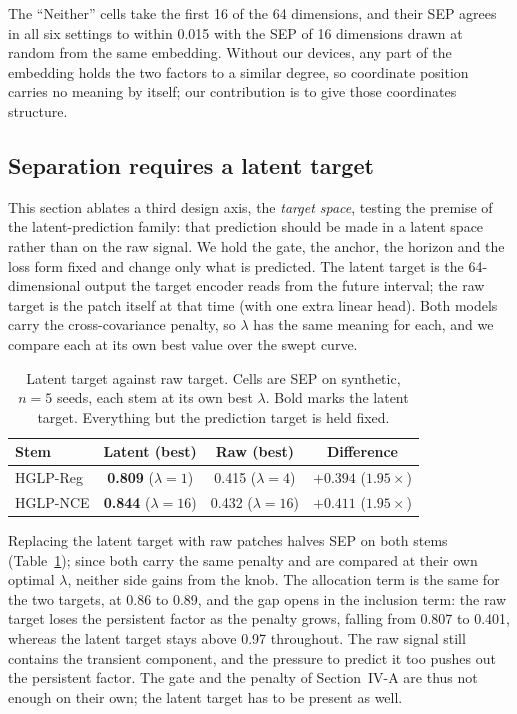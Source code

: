 The ``Neither'' cells take the first 16 of the 64 dimensions, and their SEP agrees in all six settings to within 0.015 with the SEP of 16 dimensions drawn at random from the same embedding. Without our devices, any part of the embedding holds the two factors to a similar degree, so coordinate position carries no meaning by itself; our contribution is to give those coordinates structure.

\subsection{Separation requires a latent target}

This section ablates a third design axis, the \emph{target space}, testing the premise of the latent-prediction family: that prediction should be made in a latent space rather than on the raw signal. We hold the gate, the anchor, the horizon and the loss form fixed and change only what is predicted. The latent target is the 64-dimensional output the target encoder reads from the future interval; the raw target is the patch itself at that time (with one extra linear head). Both models carry the cross-covariance penalty, so $\lambda$ has the same meaning for each, and we compare each at its own best value over the swept curve.

\begin{table}[!tbp]
\caption{Latent target against raw target. Cells are SEP on synthetic, $n=5$ seeds, each stem at its own best $\lambda$. Bold marks the latent target. Everything but the prediction target is held fixed.}
\label{tab:latentraw}
\centering
\small
\begin{tabular}{lccc}
\hline
Stem & Latent (best) & Raw (best) & Difference \\
\hline
HGLP-Reg & \textbf{0.809} ($\lambda=1$) & 0.415 ($\lambda=4$) & $+0.394$ ($1.95\times$) \\
HGLP-NCE & \textbf{0.844} ($\lambda=16$) & 0.432 ($\lambda=16$) & $+0.411$ ($1.95\times$) \\
\hline
\end{tabular}
\end{table}



Replacing the latent target with raw patches halves SEP on both stems (Table~\ref{tab:latentraw}); since both carry the same penalty and are compared at their own optimal $\lambda$, neither side gains from the knob. The allocation term is the same for the two targets, at 0.86 to 0.89, and the gap opens in the inclusion term: the raw target loses the persistent factor as the penalty grows, falling from 0.807 to 0.401, whereas the latent target stays above 0.97 throughout. The raw signal still contains the transient component, and the pressure to predict it too pushes out the persistent factor. The gate and the penalty of Section~IV-A are thus not enough on their own; the latent target has to be present as well.

